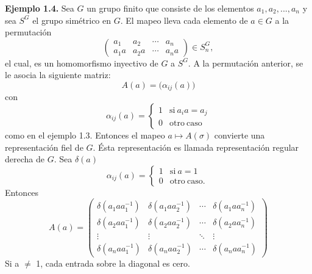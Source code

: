 \documentclass[12pt]{book}
\theoremstyle{definition}
\newcounter{in}
\newcounter{ini}
\begin{document}
\textbf{Ejemplo 1.4.} Sea $G$ un grupo finito que
consiste de los elementos $a_{1},a_{2},...,a_{n}$ y sea $S^{G}$ el
grupo simétrico en $G$. El mapeo lleva cada elemento de $a \in G$ a la
permutación
\begin{equation*}
  \begin{pmatrix}
    a_{1} & a_{2} & \cdots  & a_{n}\\ 
    a_{1}a & a_{2}a & \cdots & a_{n}a
  \end{pmatrix} 
  \in S_{n}^{G},
\end{equation*}
el cual, es un homomorfismo inyectivo de $G$ a $S^{G}$. A la permutación
anterior, se le asocia la siguiente matriz:
\begin{equation*}
  A(a)=\big(\alpha_{ij}(a)\big)
\end{equation*}
con
\begin{equation*}
         \alpha_{ij}\left(a\right) = \left\{
	       \begin{array}{ll}
		 1      & \mathrm{si\ } a_{i}a = a_{j} \\
		 0      & \mathrm{otro\ caso\ } 
	       \end{array}
	     \right.
\end{equation*}
como en el ejemplo 1.3. Entonces el mapeo
$a \mapsto A\left(\sigma\right)$ convierte una representación fiel de
$G$. Ésta representación es llamada representación regular derecha de
$G$. Sea $\delta\left(a\right)$
\begin{equation*}
         \alpha_{ij}\left(a\right) = \left\{
	       \begin{array}{ll}
		 1      & \mathrm{si\ } a = 1 \\
		 0      & \mathrm{otro\ caso.\ } 
	       \end{array}
	     \right.
\end{equation*}
Entonces
\begin{equation*}
  A\left(a\right) = 
  \begin{pmatrix}
    \delta\left(a_{1}aa_{1}^{-1}\right) & \delta\left(a_{1}aa_{2}^{-1}\right) & \cdots  & \delta\left(a_{1}aa_{n}^{-1}\right)\\
    \delta\left(a_{2}aa_{1}^{-1}\right) & \delta\left(a_{2}aa_{2}^{-1}\right) & \cdots  & \delta\left(a_{2}aa_{n}^{-1}\right)\\ 
    \vdots & \vdots & \ddots & \vdots\\
    \delta\left(a_{n}aa_{1}^{-1}\right) & \delta\left(a_{n}aa_{2}^{-1}\right) & \cdots  & \delta\left(a_{n}aa_{n}^{-1}\right)
  \end{pmatrix} 
\end{equation*}
Si a $\neq$ 1, cada entrada sobre la diagonal es cero.
\end{document}
